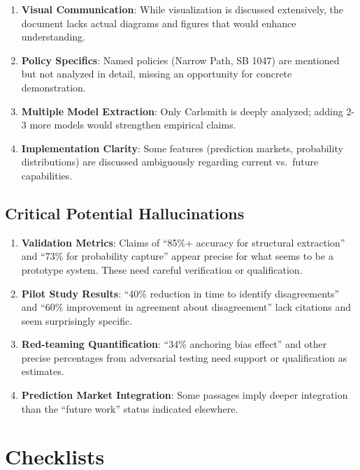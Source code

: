 \documentclass[
  11pt,
  letterpaper,
]{book}
\begin{document}
\begin{enumerate}
\def\labelenumi{\arabic{enumi}.}
\item
  \textbf{Visual Communication}: While visualization is discussed
  extensively, the document lacks actual diagrams and figures that would
  enhance understanding.
\item
  \textbf{Policy Specifics}: Named policies (Narrow Path, SB 1047) are
  mentioned but not analyzed in detail, missing an opportunity for
  concrete demonstration.
\item
  \textbf{Multiple Model Extraction}: Only Carlsmith is deeply analyzed;
  adding 2-3 more models would strengthen empirical claims.
\item
  \textbf{Implementation Clarity}: Some features (prediction markets,
  probability distributions) are discussed ambiguously regarding current
  vs.~future capabilities.
\end{enumerate}

\subsection{Critical Potential
Hallucinations}\label{critical-potential-hallucinations}

\begin{enumerate}
\def\labelenumi{\arabic{enumi}.}
\item
  \textbf{Validation Metrics}: Claims of ``85\%+ accuracy for structural
  extraction'' and ``73\% for probability capture'' appear precise for
  what seems to be a prototype system. These need careful verification
  or qualification.
\item
  \textbf{Pilot Study Results}: ``40\% reduction in time to identify
  disagreements'' and ``60\% improvement in agreement about
  disagreement'' lack citations and seem surprisingly specific.
\item
  \textbf{Red-teaming Quantification}: ``34\% anchoring bias effect''
  and other precise percentages from adversarial testing need support or
  qualification as estimates.
\item
  \textbf{Prediction Market Integration}: Some passages imply deeper
  integration than the ``future work'' status indicated elsewhere.
\end{enumerate}

\section{\texorpdfstring{Checklists }{Checklists }}\label{checklists}
\end{document}
